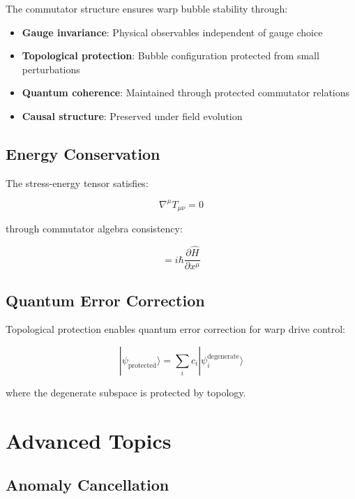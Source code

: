 \documentclass[12pt,a4paper]{article}
\begin{document}
The commutator structure ensures warp bubble stability through:

\begin{itemize}
\item \textbf{Gauge invariance}: Physical observables independent of gauge choice
\item \textbf{Topological protection}: Bubble configuration protected from small perturbations
\item \textbf{Quantum coherence}: Maintained through protected commutator relations
\item \textbf{Causal structure}: Preserved under field evolution
\end{itemize}

\subsection{Energy Conservation}

The stress-energy tensor satisfies:

\begin{equation}
\nabla^\mu T_{\mu\nu} = 0
\end{equation}

through commutator algebra consistency:

\begin{equation}
[\hat{H}, \hat{P}^\mu] = i\hbar \frac{\partial \hat{H}}{\partial x^\mu}
\end{equation}

\subsection{Quantum Error Correction}

Topological protection enables quantum error correction for warp drive control:

\begin{equation}
|\psi_{\text{protected}}\rangle = \sum_i c_i |\psi_i^{\text{degenerate}}\rangle
\end{equation}

where the degenerate subspace is protected by topology.

\section{Advanced Topics}

\subsection{Anomaly Cancellation}
\end{document}
